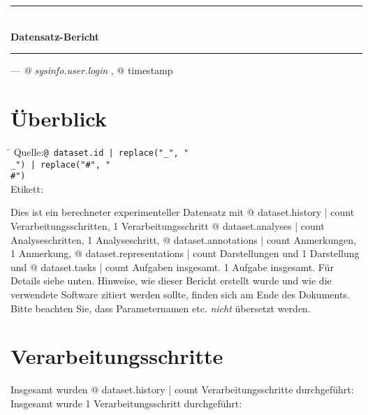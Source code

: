 

\rule[1ex]{\textwidth}{1pt}
\\[1em]
\textbf{\LARGE Datensatz-Bericht}
\\[1ex]
\rule{\textwidth}{1pt}

\hfill --- \textsl{{@ sysinfo.user.login }}, {@ timestamp }

\section{Überblick}

\begin{tabbing}
\hspace*{1.5cm}\=\kill
Quelle:\>\texttt{{@ dataset.id | replace("_", "\\_") | replace("#", "\\#") }}
\\
Etikett:
\end{tabbing}

Dies ist ein %
berechneter %
experimenteller %
Datensatz mit
{@ dataset.history | count } Verarbeitungsschritten,
1 Verarbeitungsschritt
{@ dataset.analyses | count } Analyseschritten,
1 Analyseschritt,
{@ dataset.annotations | count } Anmerkungen,
1 Anmerkung,
{@ dataset.representations | count } Darstellungen und
1 Darstellung und
{@ dataset.tasks | count } Aufgaben insgesamt.
1 Aufgabe insgesamt.
Für Details siehe unten. Hinweise, wie dieser Bericht erstellt wurde und wie die verwendete Software zitiert werden sollte, finden sich am Ende des Dokuments. Bitte beachten Sie, dass Parameternamen etc. \emph{nicht} übersetzt werden.

\section{Verarbeitungsschritte}

Insgesamt wurden {@ dataset.history | count } Verarbeitungsschritte durchgeführt:
Insgesamt wurde 1 Verarbeitungsschritt durchgeführt:

